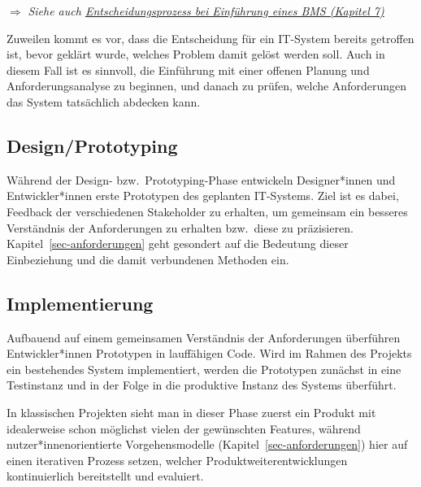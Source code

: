 \documentclass[
  11pt,
  letterpaper,
  DIV=11,
  twoside]{scrreprt}
\begin{document}
\(\Rightarrow\) \emph{Siehe auch
\hyperref[entscheidungsprozess]{Entscheidungsprozess bei Einführung
eines BMS (Kapitel 7)}}

\begin{tcolorbox}[enhanced jigsaw, leftrule=.75mm, toprule=.15mm, left=2mm, opacityback=0, arc=.35mm, colback=white, breakable, colframe=quarto-callout-tip-color-frame, rightrule=.15mm, bottomrule=.15mm]
\begin{minipage}[t]{5.5mm}
\textcolor{quarto-callout-tip-color}{\faLightbulb}
\end{minipage}%
\begin{minipage}[t]{\textwidth - 5.5mm}

Zuweilen kommt es vor, dass die Entscheidung für ein IT-System bereits
getroffen ist, bevor geklärt wurde, welches Problem damit gelöst werden
soll. Auch in diesem Fall ist es sinnvoll, die Einführung mit einer
offenen Planung und Anforderungsanalyse zu beginnen, und danach zu
prüfen, welche Anforderungen das System tatsächlich abdecken kann.

\end{minipage}%
\end{tcolorbox}

\subsection{Design/Prototyping}\label{designprototyping}

Während der Design- bzw.~Prototyping-Phase entwickeln Designer*innen und
Entwickler*innen erste Prototypen des geplanten IT-Systems. Ziel ist es
dabei, Feedback der verschiedenen Stakeholder zu erhalten, um gemeinsam
ein besseres Verständnis der Anforderungen zu erhalten bzw.~diese zu
präzisieren. Kapitel~\ref{sec-anforderungen} geht gesondert auf die
Bedeutung dieser Einbeziehung und die damit verbundenen Methoden ein.

\subsection{Implementierung}\label{implementierung}

Aufbauend auf einem gemeinsamen Verständnis der Anforderungen überführen
Entwickler*innen Prototypen in lauffähigen Code. Wird im Rahmen des
Projekts ein bestehendes System implementiert, werden die Prototypen
zunächst in eine Testinstanz und in der Folge in die produktive Instanz
des Systems überführt.

In klassischen Projekten sieht man in dieser Phase zuerst ein Produkt
mit idealerweise schon möglichst vielen der gewünschten Features,
während nutzer*innenorientierte Vorgehensmodelle
(Kapitel~\ref{sec-anforderungen}) hier auf einen iterativen Prozess
setzen, welcher Produktweiterentwicklungen kontinuierlich bereitstellt
und evaluiert.
\end{document}
